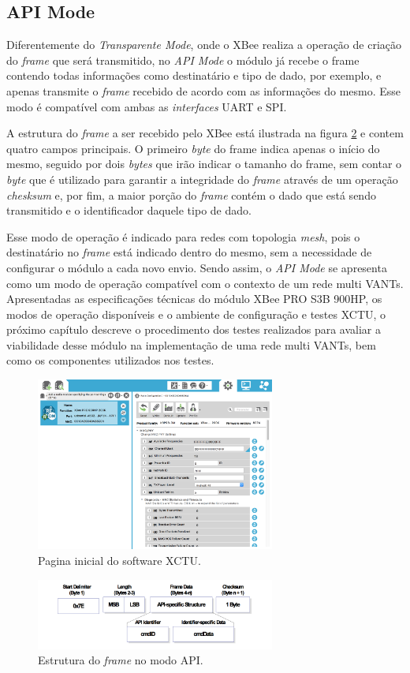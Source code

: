 \subsection{API Mode}

Diferentemente do \emph{Transparente Mode}, onde o XBee realiza a operação de criação do \emph{frame} que será transmitido, no \emph{API Mode} o módulo já recebe o frame contendo todas informações como destinatário e tipo de dado, por exemplo, e apenas transmite o \emph{frame} recebido de acordo com as informações do mesmo. Esse modo é compatível com ambas as \emph{interfaces} UART e SPI.

A estrutura do \emph{frame} a ser recebido pelo XBee está ilustrada na figura \ref{fig:apiframe} e contem quatro campos principais. O primeiro \emph{byte} do frame indica apenas o início do mesmo, seguido por dois \emph{bytes} que irão indicar o tamanho do frame, sem contar o \emph{byte} que é utilizado para garantir a integridade do \emph{frame} através de um operação \emph{chesksum} e, por fim, a maior porção do \emph{frame} contém o dado que está sendo transmitido e o identificador daquele tipo de dado.

Esse modo de operação é indicado para redes com topologia \emph{mesh}, pois o destinatário no \emph{frame} está indicado dentro do mesmo, sem a necessidade de configurar o módulo a cada novo envio. Sendo assim, o \emph{API Mode} se apresenta como um modo de operação compatível com o contexto de um rede multi VANTs.\\

Apresentadas as especificações técnicas do módulo XBee PRO S3B 900HP, os modos de operação disponíveis e o ambiente de configuração e testes XCTU, o próximo capítulo descreve o procedimento dos testes realizados para avaliar a viabilidade desse módulo na implementação de uma rede multi VANTs, bem como os componentes utilizados nos testes. 

\begin{figure} 
\center
\includegraphics[width=0.7\textwidth]{xctu.png}
\caption{Pagina inicial do software XCTU.} 
\label{fig:xctu}
\end{figure}

\begin{figure} 
\center
\includegraphics[width=0.7\textwidth]{apiframe.png}
\caption{Estrutura do \emph{frame} no modo API.} 
\label{fig:apiframe}
\end{figure}